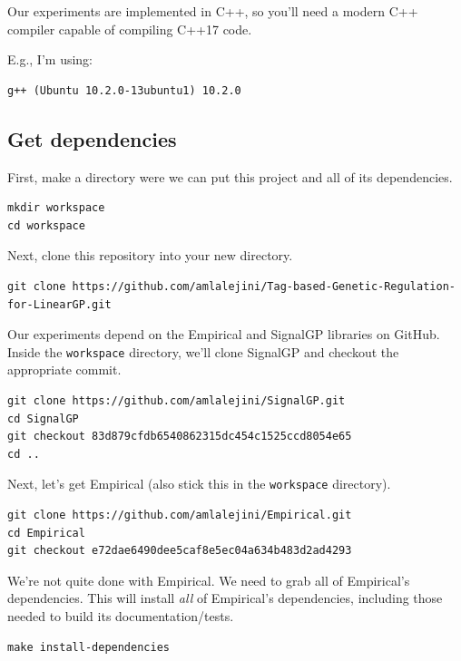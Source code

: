 \documentclass[
]{book}
\begin{document}
Our experiments are implemented in C++, so you'll need a modern C++ compiler capable of compiling C++17 code.

E.g., I'm using:

\begin{verbatim}
g++ (Ubuntu 10.2.0-13ubuntu1) 10.2.0
\end{verbatim}

\hypertarget{get-dependencies}{%
\subsection{Get dependencies}\label{get-dependencies}}

First, make a directory were we can put this project and all of its dependencies.

\begin{verbatim}
mkdir workspace
cd workspace
\end{verbatim}

Next, clone this repository into your new directory.

\begin{verbatim}
git clone https://github.com/amlalejini/Tag-based-Genetic-Regulation-for-LinearGP.git
\end{verbatim}

Our experiments depend on the Empirical and SignalGP libraries on GitHub.
Inside the \texttt{workspace} directory, we'll clone SignalGP and checkout the appropriate commit.

\begin{verbatim}
git clone https://github.com/amlalejini/SignalGP.git
cd SignalGP
git checkout 83d879cfdb6540862315dc454c1525ccd8054e65
cd ..
\end{verbatim}

Next, let's get Empirical (also stick this in the \texttt{workspace} directory).

\begin{verbatim}
git clone https://github.com/amlalejini/Empirical.git
cd Empirical
git checkout e72dae6490dee5caf8e5ec04a634b483d2ad4293
\end{verbatim}

We're not quite done with Empirical. We need to grab all of Empirical's dependencies. This will install \emph{all} of Empirical's dependencies, including those needed to build its documentation/tests.

\begin{verbatim}
make install-dependencies
\end{verbatim}
\end{document}
